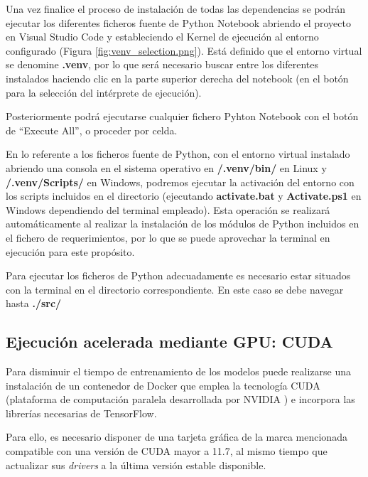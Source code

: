 Una vez finalice el proceso de instalación de todas las dependencias se podrán ejecutar los diferentes ficheros fuente de Python Notebook abriendo el proyecto en Visual Studio Code
y estableciendo el Kernel de ejecución al entorno configurado (Figura \ref{fig:venv_selection.png}).
Está definido que el entorno virtual se denomine \textbf{.venv}, por lo que será necesario buscar entre los diferentes 
instalados haciendo clic en la parte superior derecha del notebook (en el botón para la selección del intérprete de ejecución).



Posteriormente podrá ejecutarse cualquier fichero Pyhton Notebook con el botón de ``Execute All'', o proceder por celda.

En lo referente a los ficheros fuente de Python, con el entorno virtual instalado abriendo una consola en el sistema operativo en \textbf{/.venv/bin/} en Linux y \textbf{/.venv/Scripts/}
en Windows, podremos ejecutar la activación del entorno con los scripts incluidos en el directorio (ejecutando \linebreak \textbf{activate.bat} y \textbf{Activate.ps1} en Windows dependiendo del terminal empleado).
Esta operación se realizará automáticamente al realizar la instalación de los módulos de Python incluidos en el fichero de requerimientos, por lo que se puede aprovechar la terminal en ejecución para 
este propósito.

Para ejecutar los ficheros de Python adecuadamente es necesario estar situados con la terminal en el directorio correspondiente. En este caso se debe navegar hasta \textbf{./src/}

\subsection{Ejecución acelerada mediante GPU: CUDA}
Para disminuir el tiempo de entrenamiento de los modelos puede realizarse una instalación de un contenedor de Docker que emplea la tecnología
CUDA (plataforma de computación paralela desarrollada por NVIDIA \cite{misc:wikiCuda}) e incorpora las librerías necesarias de TensorFlow.

Para ello, es necesario disponer de una tarjeta gráfica de la marca mencionada compatible con una versión de CUDA mayor a 11.7, al mismo tiempo
que actualizar sus \textit{drivers} a la última versión estable disponible.

